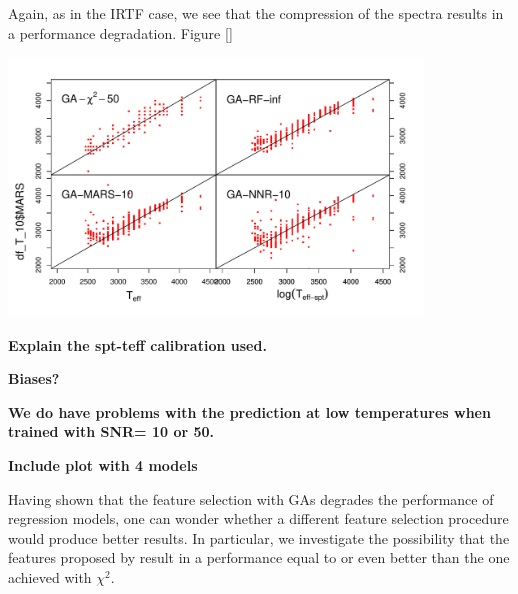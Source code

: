 Again, as in the IRTF case, we see that the compression of the spectra
results in a performance degradation. Figure \ref{} 

\begin {figure*}
 \centering
  \includegraphics[width=11cm]{figs/ipac-teff.pdf}
  \caption{Comparison between Temperature estimations from Theoretical Temperature 
  in x axis and the modeled ICA based estimation at SNR=$\infty$ on y-axis}
 \label{fig:ipac_teff}
\end {figure*}




{\bf Explain the spt-teff calibration used.}

{\bf Biases?}

{\bf We do have problems with the prediction at low temperatures when
trained with SNR= 10 or 50.}

{\bf Include plot with 4 models}



Having shown that the feature selection with GAs degrades the
performance of regression models, one can wonder whether a different
feature selection procedure would produce better results. In
particular, we investigate the possibility that the features proposed
by \cite{cesetti} result in a performance equal to or even better than
the one achieved with $\chi^2$.

